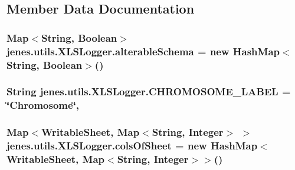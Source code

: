 \subsection{Member Data Documentation}
\hypertarget{classjenes_1_1utils_1_1_x_l_s_logger_a9951ca6377e81a1c8a3c4b72d6a205f3}{
\subsubsection[{alterable\-Schema}]{\setlength{\rightskip}{0pt plus 5cm}Map$<$String, Boolean$>$ jenes.\-utils.\-X\-L\-S\-Logger.\-alterable\-Schema = new Hash\-Map$<$String, Boolean$>$()\hspace{0.3cm}{\ttfamily [private]}}}\label{classjenes_1_1utils_1_1_x_l_s_logger_a9951ca6377e81a1c8a3c4b72d6a205f3}
\hypertarget{classjenes_1_1utils_1_1_x_l_s_logger_a7308e8bb6eda1c5bf2aef93c2607ce60}{
\subsubsection[{C\-H\-R\-O\-M\-O\-S\-O\-M\-E\-\_\-\-L\-A\-B\-E\-L}]{\setlength{\rightskip}{0pt plus 5cm}String jenes.\-utils.\-X\-L\-S\-Logger.\-C\-H\-R\-O\-M\-O\-S\-O\-M\-E\-\_\-\-L\-A\-B\-E\-L = \char`\"{}Chromosome\char`\"{}\hspace{0.3cm}{\ttfamily [static]}, {\ttfamily [private]}}}\label{classjenes_1_1utils_1_1_x_l_s_logger_a7308e8bb6eda1c5bf2aef93c2607ce60}
\hypertarget{classjenes_1_1utils_1_1_x_l_s_logger_a44fcfb206d65e2af727d24a8d4a0af31}{
\subsubsection[{cols\-Of\-Sheet}]{\setlength{\rightskip}{0pt plus 5cm}Map$<$Writable\-Sheet, Map$<$String, Integer$>$ $>$ jenes.\-utils.\-X\-L\-S\-Logger.\-cols\-Of\-Sheet = new Hash\-Map$<$Writable\-Sheet, Map$<$String, Integer$>$$>$()\hspace{0.3cm}{\ttfamily [private]}}}\label{classjenes_1_1utils_1_1_x_l_s_logger_a44fcfb206d65e2af727d24a8d4a0af31}
